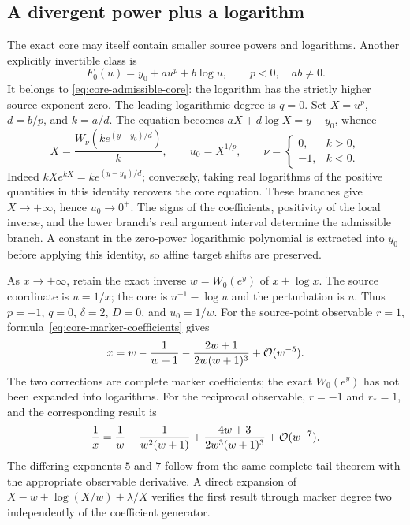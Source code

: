 \subsection{A divergent power plus a logarithm}

The exact core may itself contain smaller source powers and logarithms.
Another explicitly invertible class is
\begin{equation}
 F_0(u)=y_0+a u^p+b\log u,\qquad p<0,\quad ab\ne0.
 \label{eq:core-power-plus-log}
\end{equation}
It belongs to \eqref{eq:core-admissible-core}: the logarithm has the
strictly higher source exponent zero. The leading logarithmic degree is
$q=0$. Set $X=u^p$, $d=b/p$, and $k=a/d$. The equation becomes
$aX+d\log X=y-y_0$, whence
\begin{equation}
 X=\frac{W_\nu\!\left(k e^{(y-y_0)/d}\right)}{k},\qquad
 u_0=X^{1/p},\qquad
 \nu=\begin{cases}0,&k>0,\\-1,&k<0.\end{cases}
 \label{eq:core-power-plus-log-inverse}
\end{equation}
Indeed $kX e^{kX}=k e^{(y-y_0)/d}$; conversely, taking real logarithms
of the positive quantities in this identity recovers the core equation.
These branches give $X\to+\infty$, hence $u_0\to0^+$. The signs of the
coefficients, positivity of the local inverse, and the lower branch's
real argument interval determine the admissible branch. A constant in the
zero-power logarithmic polynomial is extracted into $y_0$ before applying this identity, so affine target shifts are preserved.

\begin{example}
\label{ex:core-power-plus-log-correction}
As $x\to+\infty$, retain the exact inverse
$w=W_0(e^y)$ of $x+\log x$. The source coordinate is $u=1/x$;
the core is $u^{-1}-\log u$ and the perturbation is $u$. Thus
$p=-1$, $q=0$, $\delta=2$, $D=0$, and $u_0=1/w$.
For the source-point observable $r=1$, formula~\eqref{eq:core-marker-coefficients}
gives
\begin{equation}
 x=w-\frac{1}{w+1}
       -\frac{2w+1}{2w(w+1)^3}
       +\mathcal O(w^{-5}).
 \label{eq:core-power-plus-log-expansion}
\end{equation}
The two corrections are complete marker coefficients; the exact $W_0(e^y)$
has not been expanded into logarithms. For the reciprocal observable,
$r=-1$ and $r_*=1$, and the corresponding result is
\begin{equation}
 \frac1x=\frac1w+\frac{1}{w^2(w+1)}
       +\frac{4w+3}{2w^3(w+1)^3}
       +\mathcal O(w^{-7}).
 \label{eq:core-power-plus-log-reciprocal}
\end{equation}
The differing exponents $5$ and $7$ follow from the same complete-tail
theorem with the appropriate observable derivative. A direct expansion
of $X-w+\log(X/w)+\lambda/X$ verifies the first result through marker
degree two independently of the coefficient generator.
\end{example}

